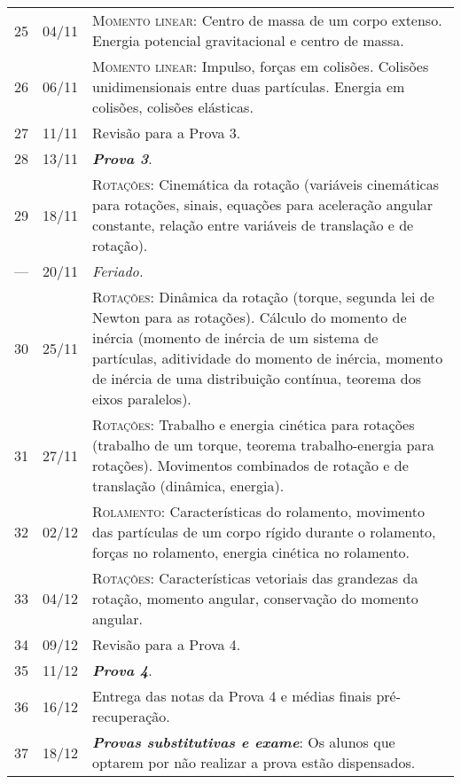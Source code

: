 \begin{center}
\begin{longtable}{ccp{70mm}}
25	 & 	04/11	 & 	\textsc{Momento linear:} Centro de massa de um corpo extenso. Energia potencial gravitacional e centro de massa. \\
26	 & 	06/11	 & 	\textsc{Momento linear:} Impulso, forças em colisões. Colisões unidimensionais entre duas partículas. Energia em colisões, colisões elásticas. \\
27	 & 	11/11	 & 	Revisão para a Prova 3. \\
28	 & 	13/11	 & 	\textbf{\textit{Prova 3}}. \\
29	 & 	18/11	 & 	\textsc{Rotações:} Cinemática da rotação (variáveis cinemáticas para rotações, sinais, equações para aceleração angular constante, relação entre variáveis de translação e de rotação). \\
---	 & 	20/11	 & \emph{Feriado.} \\
30	 &  	25/11	 & 	\textsc{Rotações:} Dinâmica da rotação (torque, segunda lei de Newton para as rotações). Cálculo do momento de inércia (momento de inércia de um sistema de partículas, aditividade do momento de inércia, momento de inércia de uma distribuição contínua, teorema dos eixos paralelos). \\
31	 & 	27/11	 & 	\textsc{Rotações:} Trabalho e energia cinética para rotações (trabalho de um torque, teorema trabalho-energia para rotações). Movimentos combinados de rotação e de translação (dinâmica, energia). \\
32	 & 	02/12	 & 	\textsc{Rolamento:} Características do rolamento, movimento das partículas de um corpo rígido durante o rolamento, forças no rolamento, energia cinética no rolamento. \\
33 	 & 	04/12	 & 	\textsc{Rotações:} Características vetoriais das grandezas da rotação, momento angular, conservação do momento angular. \\
34 	 & 	09/12	 & 	Revisão para a Prova 4. \\
35 	 & 	11/12	 & 	\textbf{\textit{Prova 4}}. \\
36 	 & 	16/12	 & 	Entrega das notas da Prova 4 e médias finais pré-recuperação. \\
37 	 & 	18/12	 & 	\textbf{\textit{Provas substitutivas e exame}}: Os alunos que optarem por não realizar a prova estão dispensados. \\
\end{longtable}
\end{center}


\cleardoublepage

